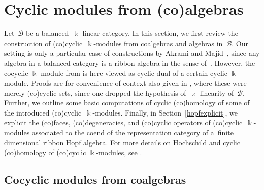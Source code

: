 \documentclass[pdftex]{sigma}
\numberwithin{equation}{section}
\newcommand{\mc}{\mathcal}
\newcommand{\kk}{\Bbbk}
\begin{document}
\section{Cyclic modules from (co)algebras} \label{algebraiccyclic}



Let~$\mc B$ be a balanced~$\kk$-linear category. In this section, we first review the construction of (co)cyclic~$\kk$-modules from coalgebras and algebras in~$\mc B$. Our setting is only a particular case of constructions by Akrami and Majid~\cite{cycliccocycles}, since any algebra in a balanced category is a ribbon algebra in the sense of~\cite{cycliccocycles}. However, the cocyclic $\kk$-module from \cite{cycliccocycles} is here viewed as cyclic dual of a certain cyclic $\kk$-module.
Proofs are for convenience of context also given in \cite{bartulovic2022cyclicsetsribbonstring}, where these were merely (co)cyclic sets, since one dropped the hypothesis of~$\kk$-linearity of~$\mc B$. Further, we outline some basic computations of cyclic (co)homology of some of the introduced (co)cyclic~$\kk$-modules.
Finally, in Section~\ref{hopfexplicit}, we explicit the (co)faces, (co)degeneracies, and (co)cyclic operators of (co)cyclic~$\kk$-modules associated to the coend of the representation category of a~finite dimensional ribbon Hopf algebra. For more details on Hochschild and cyclic (co)homology of (co)cyclic $\kk$-modules, see \cite[Section~9.6]{weibel}.

\subsection{Cocyclic modules from coalgebras} \label{objetdedebut}
\end{document}
